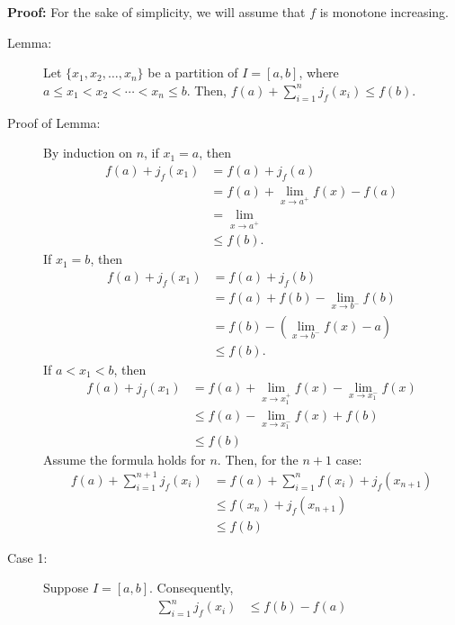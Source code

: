 \documentclass[10pt]{extarticle}
\begin{document}
   \textbf{Proof:} For the sake of simplicity, we will assume that $f$ is monotone increasing.
    \begin{description}
      \item[Lemma:] Let $\{x_1,x_2,\dots,x_n\}$ be a partition of $I = [a,b]$, where $a \leq x_1 < x_2 < \cdots < x_n \leq b$. Then, $f(a) + \sum_{i=1}^{n}j_f(x_i) \leq f(b)$.
      \item[Proof of Lemma:] By induction on $n$, if $x_1 = a$, then
        \begin{align*}
          f(a) + j_f(x_1)&= f(a) + j_f(a)\\
                         &= f(a) + \lim_{x\rightarrow a^{+}}f(x) - f(a)\\
                         &= \lim_{x\rightarrow a^{+}}\\
                         &\leq f(b).
        \end{align*}
        If $x_1 = b$, then
        \begin{align*}
          f(a) + j_f(x_1) &= f(a) + j_f(b)\\
                          &= f(a) + f(b) - \lim_{x\rightarrow b^{-}}f(b)\\
                          &= f(b) - (\lim_{x\rightarrow b^{-}}f(x) - a)\\
                          &\leq f(b).
        \end{align*}
        If $a < x_1 < b$, then
        \begin{align*}
          f(a) + j_f(x_1) &= f(a) + \lim_{x\rightarrow x_1^{+}}f(x) - \lim_{x\rightarrow x_1^{-}}f(x)\\
                          &\leq f(a) - \lim_{x\rightarrow x_1^{-}}f(x) + f(b)\\
                          &\leq f(b)
        \end{align*}
        Assume the formula holds for $n$. Then, for the $n+1$ case:
        \begin{align*}
          f(a) + \sum_{i=1}^{n+1}j_f(x_i) &= f(a) + \sum_{i=1}^{n}f(x_i) + j_f(x_{n+1})\\
                                          &\leq f(x_n) + j_{f}(x_{n+1})\\
                                          &\leq f(b)
        \end{align*}
      \item[Case 1:] Suppose $I = [a,b]$. Consequently,
        \begin{align*}
          \sum_{i=1}^{n} j_f(x_i) &\leq f(b) - f(a)\\

\end{align*}
\end{description}
\end{document}
